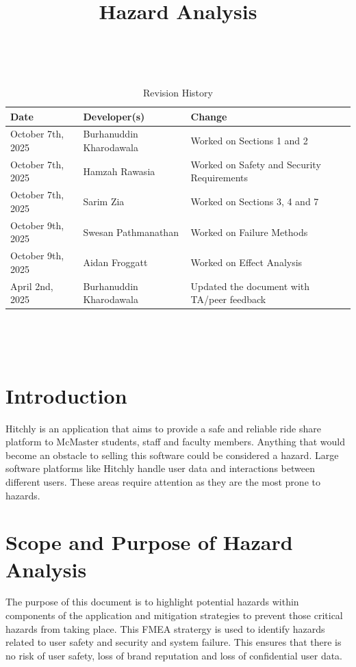 \documentclass{article}
\title{Hazard Analysis\\\progname}
\author{\authname}
\date{}
\begin{document}
\maketitle
\thispagestyle{empty}

~\newpage


\begin{table}[hp]
\caption{Revision History} \label{TblRevisionHistory}
\begin{tabularx}{\textwidth}{llX}
\toprule
\textbf{Date} & \textbf{Developer(s)} & \textbf{Change}\\
\midrule
October 7th, 2025 & Burhanuddin Kharodawala & Worked on Sections 1 and 2\\
October 7th, 2025 & Hamzah Rawasia & Worked on Safety and Security Requirements\\
October 7th, 2025 & Sarim Zia & Worked on Sections 3, 4 and 7\\
October 9th, 2025 & Swesan Pathmanathan & Worked on Failure Methods\\
October 9th, 2025 & Aidan Froggatt & Worked on Effect Analysis\\
April 2nd, 2025 & Burhanuddin Kharodawala & Updated the document with TA/peer feedback\\
\bottomrule
\end{tabularx}
\end{table}

~\newpage

\tableofcontents

~\newpage


\section{Introduction}
Hitchly is an application that aims to provide a safe and reliable ride share platform to McMaster students, staff and faculty members. Anything that would become an obstacle to selling this software could be considered a hazard. Large software platforms like Hitchly handle user data and interactions between different users. These areas require attention as they are the most prone to hazards.  

\section{Scope and Purpose of Hazard Analysis}
The purpose of this document is to highlight potential hazards within components of the application and mitigation strategies to prevent those critical hazards from taking place. This FMEA stratergy is used to identify hazards related to user safety and security and system failure. This ensures that there is no risk of user safety, loss of brand reputation and loss of confidential user data. 
\end{document}
